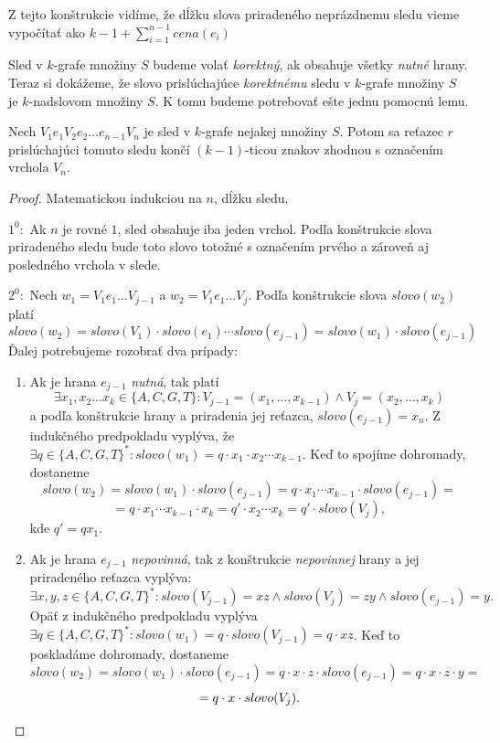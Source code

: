 Z tejto konštrukcie vidíme, že dĺžku slova priradeného neprázdnemu sledu vieme
vypočítať ako $k-1 + \sum \limits_{i=1}^{n-1} cena(e_i)$

Sled v $k$-grafe množiny $S$ budeme volať \emph{korektný}, ak obsahuje všetky \emph{nutné} hrany.
Teraz si dokážeme, že slovo prislúchajúce \emph{korektnému} sledu v $k$-grafe množiny $S$ je
$k$-nadslovom množiny $S$. K tomu budeme potrebovať ešte jednu pomocnú lemu.

\begin{lema}
\label{vertex_end_lemma}
    Nech $V_1 e_1 V_2 e_2 \ldots e_{n-1} V_n$ je sled v $k$-grafe nejakej množiny $S$.
    Potom sa reťazec $r$ prislúchajúci tomuto sledu končí $(k-1)$-ticou znakov zhodnou
    s označením vrchola $V_n$.
\end{lema}

\begin{proof}
    Matematickou indukciou na $n$, dĺžku sledu.
   
    $1^0:$ Ak $n$ je rovné $1$, sled obsahuje iba jeden vrchol. Podľa konštrukcie slova
           priradeného sledu bude toto slovo totožné s označením prvého a zároveň aj
           posledného vrchola v slede.

    $2^0:$ Nech $w_1 = V_1 e_1 \ldots V_{j-1}$ a $w_2 = V_1 e_1 \ldots V_j$. Podľa konštrukcie slova $slovo(w_2)$ platí
           $$ slovo(w_2) = slovo(V_1) \cdot slovo(e_1) \cdots slovo(e_{j-1}) = slovo(w_1) \cdot slovo(e_{j-1})$$
           Ďalej potrebujeme rozobrať dva prípady:
           \begin{enumerate}
            \item Ak je hrana $e_{j-1}$ \emph{nutná}, tak platí
                  $$ \exists x_1, x_2 \ldots x_k \in \{A, C, G, T \}: V_{j-1} = (x_1, \ldots , x_{k-1}) \wedge V_j = (x_2, \ldots , x_k)$$
                  a podľa konštrukcie hrany a priradenia jej reťazca, $slovo(e_{j-1}) = x_n$.
                  Z indukčného predpokladu vyplýva, že $\exists q \in \{ A, C, G, T\}^*: slovo(w_1) = q \cdot x_1 \cdot x_2 \cdots x_{k-1}$. Keď to
                  spojíme dohromady, dostaneme
                  $$ slovo(w_2) = slovo(w_1) \cdot slovo(e_{j - 1}) = q \cdot x_1 \cdots x_{k - 1} \cdot slovo(e_{j - 1}) = $$
                  $$ = q \cdot x_1 \cdots x_{k - 1} \cdot x_k = q' \cdot x_2 \cdots x_k = q' \cdot slovo(V_j),$$
                  kde $q' = qx_1$.

            \item Ak je hrana $e_{j - 1}$ \emph{nepovinná}, tak z konštrukcie \emph{nepovinnej} hrany a jej priradeného reťazca
                  vyplýva:
                  $$ \exists x, y, z \in \{ A, C, G, T\}^* : slovo(V_{j - 1}) = xz \wedge slovo(V_{j}) = zy \wedge slovo(e_{j - 1}) = y.$$
                  Opäť z indukčného predpokladu vyplýva $ \exists q \in \{A, C, G, T\}^*: slovo(w_1) = q \cdot slovo(V_{j-1}) = q \cdot xz$.
                  Keď to poskladáme dohromady, dostaneme
                  $$ slovo(w_2) = slovo(w_1) \cdot slovo(e_{j - 1}) = q \cdot x \cdot z \cdot slovo(e_{j - 1}) = q \cdot x \cdot z \cdot y = $$
                  $$ = q \cdot x \cdot slovo(V_j).\qedhere$$

           \end{enumerate}
\end{proof}

